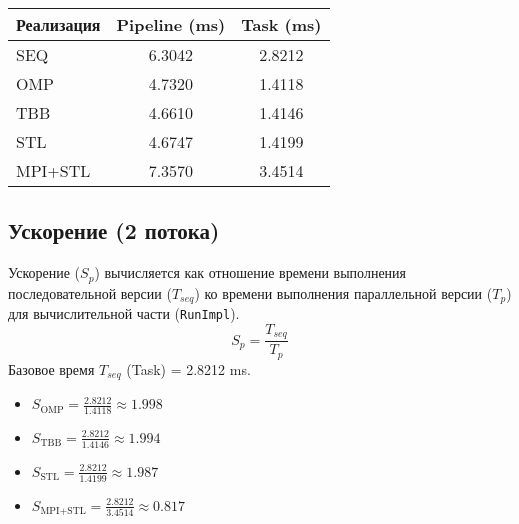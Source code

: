 \documentclass[12pt]{article}
\begin{document}
\begin{tabular}{|l|c|c|}
\hline
\textbf{Реализация} & \textbf{Pipeline (ms)} & \textbf{Task (ms)} \\
\hline
SEQ       & 6.3042 & 2.8212 \\
OMP       & 4.7320 & 1.4118 \\
TBB       & 4.6610 & 1.4146 \\
STL       & 4.6747 & 1.4199 \\
MPI+STL   & 7.3570 & 3.4514 \\
\hline
\end{tabular}

\subsection*{Ускорение (2 потока)}
Ускорение ($S_p$) вычисляется как отношение времени выполнения последовательной версии ($T_{seq}$) ко времени выполнения параллельной версии ($T_p$) для вычислительной части (\texttt{RunImpl}).
\[ S_p = \frac{T_{seq}}{T_p} \]
Базовое время $T_{seq}$ (Task) = 2.8212 ms.

\begin{itemize}
    \item $S_{\text{OMP}} = \frac{2.8212}{1.4118} \approx 1.998$
    \item $S_{\text{TBB}} = \frac{2.8212}{1.4146} \approx 1.994$
    \item $S_{\text{STL}} = \frac{2.8212}{1.4199} \approx 1.987$
    \item $S_{\text{MPI+STL}} = \frac{2.8212}{3.4514} \approx 0.817$
\end{itemize}
\end{document}
